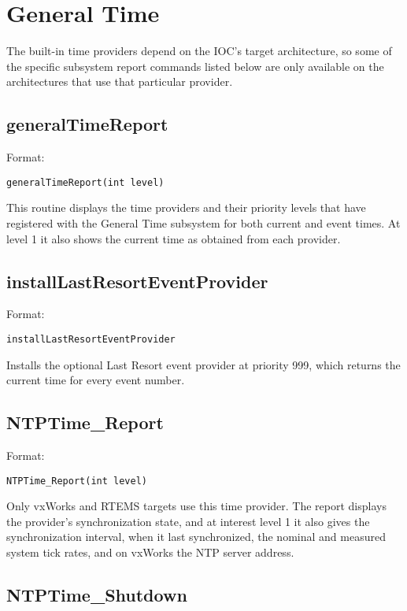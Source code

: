 \section{General Time}

The built-in time providers depend on the IOC's target architecture, so some of the specific subsystem report commands 
listed below are only available on the architectures that use that particular provider.

\subsection{generalTimeReport}

Format:

\begin{verbatim}generalTimeReport(int level)
\end{verbatim}This routine displays the time providers and their priority levels that have registered with the General Time subsystem  for 
both current and event times. At level 1 it also shows the current time as obtained from each provider.

\subsection{installLastResortEventProvider}

Format:

\begin{verbatim}installLastResortEventProvider
\end{verbatim}Installs the optional Last Resort event provider at priority 999, which returns the current time for every event number.

\subsection{NTPTime\_Report}

Format:

\begin{verbatim}NTPTime_Report(int level)
\end{verbatim}Only vxWorks and RTEMS targets use this time provider. The report displays the provider's synchronization state, and at 
interest level 1 it also gives the synchronization interval, when it last synchronized, the nominal and measured system tick 
rates, and on vxWorks the NTP server address.

\subsection{NTPTime\_Shutdown}

